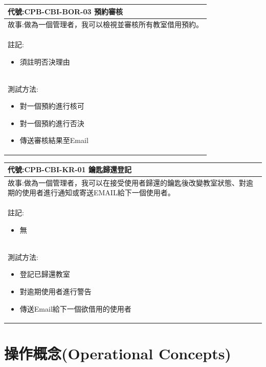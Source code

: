 \documentclass{article}
\begin{document}
\begin{table}[H]
    \begin{tabular}{| m{13cm} |}
		\hline
	代號:CPB-CBI-BOR-03	預約審核	\\ \hline
	故事:做為一個管理者，我可以檢視並審核所有教室借用預約。		\\	\hline
	註記:
	\begin{itemize}
		\item 須註明否決理由
	\end{itemize}		\\ \hline
	測試方法:	
	\begin{itemize}
		\item 對一個預約進行核可
		\item 對一個預約進行否決
		\item 傳送審核結果至Email
	\end{itemize}
	\\	\hline
    \end{tabular}
\end{table}

\begin{table}[H]
    \begin{tabular}{| m{13cm} |}
		\hline
	代號:CPB-CBI-KR-01	鑰匙歸還登記	\\ \hline
	故事:做為一個管理者，我可以在接受使用者歸還的鑰匙後改變教室狀態、對逾期的使用者進行通知或寄送EMAIL給下一個使用者。		\\	\hline
	註記:
	\begin{itemize}
		\item 無
	\end{itemize}		\\ \hline
	測試方法:	
	\begin{itemize}
		\item 登記已歸還教室
		\item 對逾期使用者進行警告
		\item 傳送Email給下一個欲借用的使用者
	\end{itemize}
	\\	\hline
    \end{tabular}
\end{table}

\newpage

\section[操作概念(OPERATIONAL CONCEPTS)]{操作概念(Operational Concepts)}

\newpage
\end{document}
